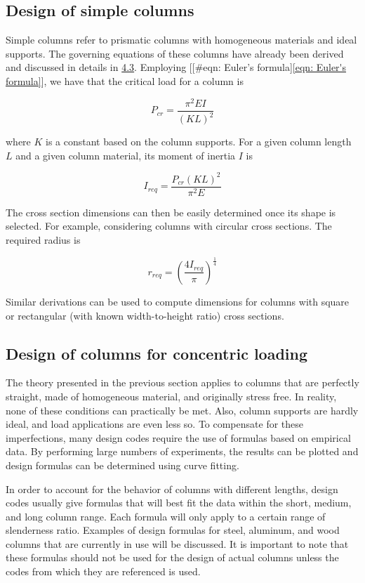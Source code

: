 \documentclass[a4paper,openany,12pt]{book}
\begin{document}
{{\subsection{Design of simple columns}
\label{design-of-simple-columns}
Simple columns refer to prismatic columns with homogeneous materials and
ideal supports. The governing equations of these columns have already
been derived and discussed in details in \hyperref[section: buckling]{4.3}.
Employing [[\#eqn: Euler's formula]\ref{eqn: Euler's formula}], we have
that the critical load for a column is

$$P_{cr} = \frac{\pi ^2EI}{(KL)^2}$$

where \(K\) is a constant based on the column supports. For a given column
length \(L\) and a given column material, its moment of inertia \(I\) is

$$I_{req} = \frac{P_{cr}(KL)^2}{\pi ^2E}$$

The cross section dimensions can then be easily determined once its
shape is selected. For example, considering columns with circular cross
sections. The required radius is

$$r_{req} = \left( \frac{4I_{req}}{\pi } \right)^{\frac{1}{4}}$$

Similar derivations can be used to compute dimensions for columns with
square or rectangular (with known width-to-height ratio) cross sections.

\subsection{Design of columns for concentric loading}
\label{subsection: column concentric loading}
The theory presented in the previous section applies to columns that are
perfectly straight, made of homogeneous material, and originally stress
free. In reality, none of these conditions can practically be met. Also,
column supports are hardly ideal, and load applications are even less
so. To compensate for these imperfections, many design codes require the
use of formulas based on empirical data. By performing large numbers of
experiments, the results can be plotted and design formulas can be
determined using curve fitting.

In order to account for the behavior of columns with different lengths,
design codes usually give formulas that will best fit the data within
the short, medium, and long column range. Each formula will only apply
to a certain range of slenderness ratio. Examples of design formulas for
steel, aluminum, and wood columns that are currently in use will be
discussed. It is important to note that these formulas should not be
used for the design of actual columns unless the codes from which they
are referenced is used.

}}
\end{document}
